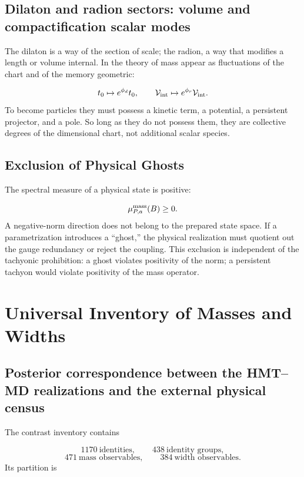 \subsection{Dilaton and radion sectors: volume and compactification scalar modes}
The dilaton is a way of the section of scale; the radion, a way that modifies a length or volume internal. In the theory of mass appear as fluctuations of the chart and of the memory geometric:

\[
 t_0\mapsto e^{\phi_d}t_0,\qquad
 \mathcal V_{\rm int}\mapsto e^{\phi_r}\mathcal V_{\rm int}.
\]
To become particles they must possess a kinetic term, a potential, a persistent projector, and a pole. So long as they do not possess them, they are collective degrees of the dimensional chart, not additional scalar species.

\subsection{Exclusion of Physical Ghosts}
The spectral measure of a physical state is positive:

\[
 \mu_{P,a}^{\rm mass}(B)\ge0.
\]
A negative-norm direction does not belong to the prepared state space. If a parametrization introduces a “ghost,” the physical realization must quotient out the gauge redundancy or reject the coupling. This exclusion is independent of the tachyonic prohibition: a ghost violates positivity of the norm; a persistent tachyon would violate positivity of the mass operator.

\section{Universal Inventory of Masses and Widths}
\subsection{Posterior correspondence between the HMT–MD realizations and the external physical census}
The contrast inventory contains

\[
 1170\ \text{identities},\qquad
 438\ \text{identity groups},
\]
\[
 471\ \text{mass observables},\qquad
 384\ \text{width observables}.
\]
Its partition is

